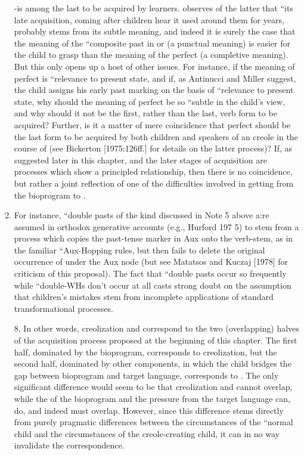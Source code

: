 \begin{enumerate}
{}-is among the last to be acquired by  learners. \citet{Maratsos1979} observes of the latter that ``its late acquisition, coming after children hear it used around them for years, probably stems from its subtle meaning, and indeed it is surely the case that the meaning of the ``composite past in  or  (a punctual meaning) is easier for the child to grasp than the meaning of the  perfect (a com\-pletive meaning). But this only opens up a host of other issues. For instance, if the meaning of  perfect is ``relevance to present state, and if, as Antinucci and Miller suggest, the child assigns his early past marking on the basis of ``relevance to present state, why should the meaning of perfect be so ``subtle in the child's view, and why should it not be the first, rather than the last, verb form to be acquired? Further, is it a matter of mere coincidence that perfect should be the last form to be acquired by both children   and speakers of an  creole in the course of  (see Bickerton [1975:126ff.] for details on the latter process)? If, as suggested later in this chapter,  and the later stages of acquisition are processes which show a principled relationship, then there is no coincidence, but rather a joint reflection of one of the difficulties involved in getting from the bioprogram to .


\item For instance, ``double pasts of the kind discussed in Note 5 above a:re assumed in orthodox generative accounts (e.g., Hurford 197 5) to stem from a process which copies the past-tense marker in Aux onto the verb-stem, as in the familiar ``Aux-Hopping rules, but then fails to delete the original occurrence of  under the Aux node (but see Matatsos and Kuczaj [1978] for criticism of this proposal). The fact that ``double pasts occur so frequently while ``double-WHs don't occur at all casts strong doubt on the assumption that children's mistakes stem from incomplete applications of standard transformational processes. 

8, In other words, creolization and  correspond to the two (overlapping) halves of the acquisition process proposed at the beginning of this chapter. The first half, dominated by the bio\-program, corresponds to creolization, but the second half, dominated by other components, in which the child bridges the gap between bioprogram and target language, corresponds to . The only significant difference would seem to be that creolization and  cannot overlap, while the  of the bioprogram and the pressure from the target language can, do, and indeed must overlap. However, since this difference stems directly from purely pragmatic differences between the circumstances of the ``normal child and the circumstances of the creole-creating child, it can in no way invalidate the correspondence.
 

\end{enumerate}
